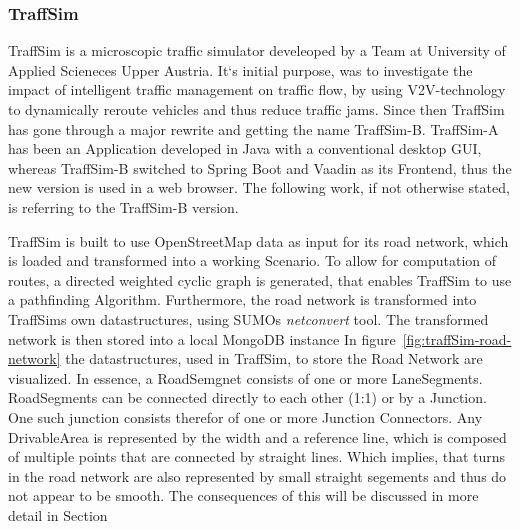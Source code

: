         \subsubsection{TraffSim}
            TraffSim is a microscopic traffic simulator develeoped by a Team at University of Applied Scieneces Upper Austria.
            It`s initial purpose, was to investigate the impact of intelligent traffic management on traffic flow, by using V2V-technology to dynamically reroute vehicles and thus reduce traffic jams.
            Since then TraffSim has gone through a major rewrite and getting the name TraffSim-B.
            TraffSim-A has been an Application developed in Java with a conventional desktop GUI, whereas TraffSim-B switched to Spring Boot\cite{walls2015spring} and Vaadin\cite{gronroos2009book} as its Frontend, thus the new version is used in a web browser.
            The following work, if not otherwise stated, is referring to the TraffSim-B version.

            TraffSim is built to use OpenStreetMap data as input for its road network, which is loaded and transformed into a working Scenario.
            To allow for computation of routes, a directed weighted cyclic graph is generated, that enables TraffSim to use a pathfinding Algorithm\cite{foead2021systematic}.
            Furthermore, the road network is transformed into TraffSims own datastructures, using SUMOs \textit{netconvert} tool.
            The transformed network is then stored into a local MongoDB instance
            In figure~\ref{fig:traffSim-road-network} the datastructures, used in TraffSim, to store the Road Network are visualized.
            In essence, a RoadSemgnet consists of one or more LaneSegments.
            RoadSegments can be connected directly to each other (1:1) or by a Junction.
            One such junction consists therefor of one or more Junction Connectors.
            Any DrivableArea is represented by the width and a reference line, which is composed of multiple points that are connected by straight lines.
            Which implies, that turns in the road network are also represented by small straight segements and thus do not appear to be smooth.
            The consequences of this will be discussed in more detail in Section %


